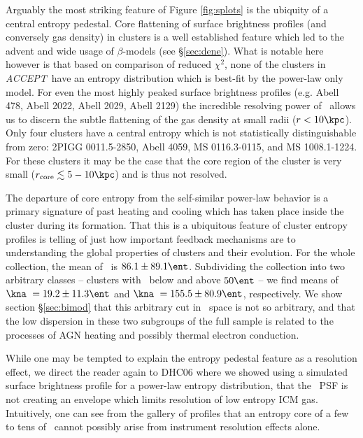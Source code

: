 \documentclass[12pt, preprint]{aastex}
\newcommand{\accept}{\textit{ACCEPT}}
\begin{document}
{Arguably the most striking feature of Figure \ref{fig:splots} is the
ubiquity of a central entropy pedestal. Core flattening of surface
brightness profiles (and conversely gas density) in clusters is a well
established feature which led to the advent and wide usage of
$\beta$-models (see \S\ref{sec:dene}). What is notable here however is
that based on comparison of reduced $\chi^2$, none of the clusters in
\accept\ have an entropy distribution which is best-fit by the power-law
only model. For even the most highly peaked surface brightness
profiles (e.g. Abell 478, Abell 2022, Abell 2029, Abell 2129) the
incredible resolving power of \Chandra\ allows us to discern the
subtle flattening of the gas density at small radii ($r < 10
\kpc$). Only four clusters have a central entropy which is not
statistically distinguishable from zero: 2PIGG 0011.5-2850, Abell
4059, MS 0116.3-0115, and MS 1008.1-1224. For these clusters it may be
the case that the core region of the cluster is very small
($r_{\mathrm{core}} \lesssim 5-10\kpc$) and is thus not resolved.

The departure of core entropy from the self-similar power-law
behavior is a primary signature of past heating and cooling which has
taken place inside the cluster during its formation. That this is a
ubiquitous feature of cluster entropy profiles is telling of just how
important feedback mechanisms are to understanding the global
properties of clusters and their evolution. For the whole collection,
the mean of \kna\ is $86.1 \pm 89.1 \ent$. Subdividing the collection
into two arbitrary classes -- clusters with \kna\ below and above $50
\ent$ -- we find means of $\kna\ = 19.2 \pm 11.3 \ent$ and $\kna\ =
155.5 \pm 80.9 \ent$, respectively. We show section \S\ref{sec:bimod}
that this arbitrary cut in \kna\ space is not so arbitrary, and that
the low dispersion in these two subgroups of the full sample is
related to the processes of AGN heating and possibly thermal electron
conduction.

While one may be tempted to explain the entropy pedestal feature
as a resolution effect, we direct the reader again to DHC06 where we
showed using a simulated surface brightness profile for a power-law
entropy distribution, that the \Chandra\ PSF is not creating an
envelope which limits resolution of low entropy ICM gas. Intuitively,
one can see from the gallery of profiles that an entropy core of a few
to tens of \kpc\ cannot possibly arise from instrument resolution
effects alone.

}
\end{document}
